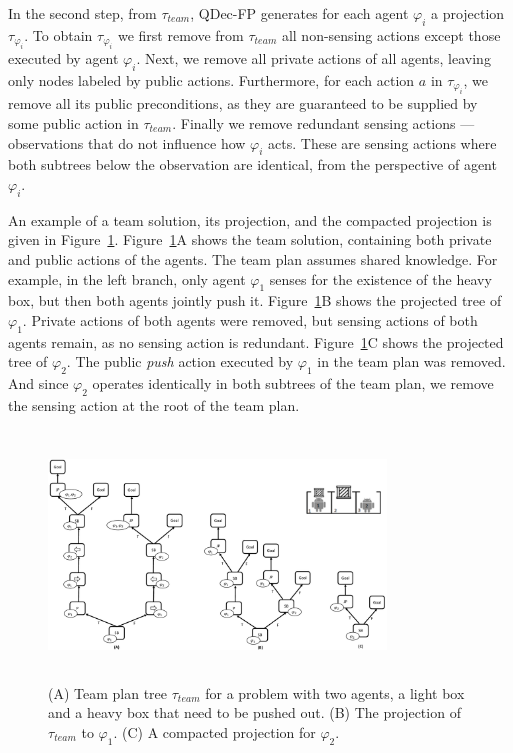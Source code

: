 \documentclass[letterpaper]{article}
\theoremstyle{definition}
\begin{document}
In the second step, from $\tau_{team}$, QDec-FP generates for each agent $\varphi_i$ a projection $\tau_{\varphi_i}$. To obtain $\tau_{\varphi_i}$ we first remove from $\tau_{team}$ all non-sensing actions except those executed by agent $\varphi_i$. Next, we remove all private actions of all agents, leaving only nodes labeled by public actions.
Furthermore, for each action $a$ in $\tau_{\varphi_i}$, we remove all its public preconditions, as they are guaranteed to be supplied by some public action in $\tau_{team}$.
Finally we remove redundant sensing actions --- observations that do not influence how $\varphi_i$ acts. These are sensing actions where both subtrees below the observation are identical, from the perspective of agent $\varphi_i$.

An example of a team solution, its projection, and the compacted projection is given in Figure~\ref{fig:projected}.  Figure~\ref{fig:projected}A shows the team solution, containing both private and public actions of the %
agents. The team plan assumes shared knowledge.
For example,
in the left branch, only agent $\varphi_1$ senses for the existence of the heavy box, but then both agents jointly push it. Figure~\ref{fig:projected}B shows the projected tree of $\varphi_1$. Private actions of both agents were removed, but sensing actions of both agents remain,
as no sensing action is redundant. Figure~\ref{fig:projected}C shows the projected tree of $\varphi_2$. The public {\em push} action executed by $\varphi_1$ in the team plan was removed. And since $\varphi_2$ operates identically in both subtrees of the team plan, we remove the sensing action at the root of the team plan.

\begin{figure}[h!]
\centering
\includegraphics[width=0.8\textwidth, height=2.6in]{main-projection.pdf}
\caption{(A) Team plan tree $\tau_{team}$ for a problem with two agents, a light box and a heavy box that need to be pushed out.
(B) The projection of $\tau_{team}$ to $\varphi_1$.
(C) A compacted projection for $\varphi_2$.
}
\label{fig:projected}
\end{figure}
\end{document}
